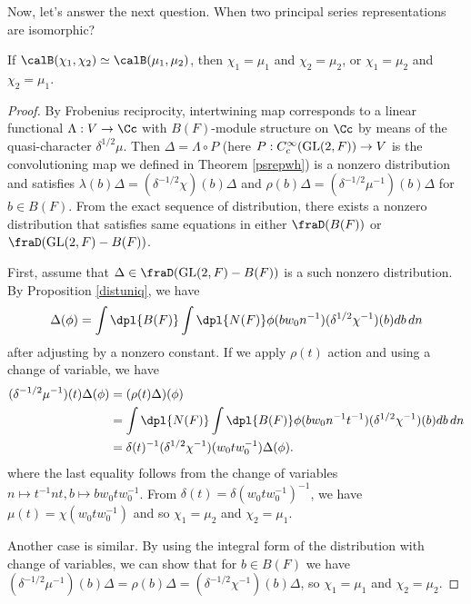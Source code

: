 Now, let's answer the next question. When two principal series representations  are isomorphic?
\begin{theorem}
If $\calB(\chi_1, \chi_2)\simeq \calB(\mu_1, \mu_2)$, then $\chi_1 = \mu_1$ and $\chi_2 = \mu_2$, or $\chi_1 = \mu_2$ and $\chi_2 = \mu_1$. 
\end{theorem}
\begin{proof}
By Frobenius reciprocity, intertwining map corresponds to a linear functional $\Lambda:V\to \Cc$ with $B(F)$-module structure on $\Cc$ by means of the quasi-character $\delta^{1/2}\mu$. 
Then $\Delta = \Lambda \circ P$ (here $P:C_{c}^{\infty}(\mathrm{GL}(2, F))\to V$ is the convolutioning map we defined in Theorem \ref{psrepwh})  is a nonzero distribution and satisfies $\lambda(b)\Delta = (\delta^{-1/2}\chi)(b)\Delta$ and $\rho(b)\Delta = (\delta^{-1/2}\mu^{-1})(b)\Delta$ for $b\in B(F)$. 
From the exact sequence of distribution, there exists a nonzero distribution that satisfies same equations in either $\fraD(B(F))$ or $\fraD(\GL(2, F) - B(F))$. 

First, assume that  $\Delta\in \fraD(\GL(2, F) - B(F))$ is a such nonzero distribution. By Proposition \ref{distuniq}, we have
$$
\Delta(\phi) = \int\dpl{B(F)}\int\dpl{N(F)} \phi(bw_{0}n^{-1}) (\delta^{1/2}\chi^{-1})(b) db\,dn
$$
after adjusting by a nonzero constant. If we apply $\rho(t)$ action and using a change of variable, we have
\begin{align*}
(\delta^{-1/2}\mu^{-1})(t)\Delta(\phi) &= (\rho(t)\Delta)(\phi) \\
&=\int\dpl{N(F)}\int\dpl{B(F)} \phi(bw_{0}n^{-1}t^{-1})(\delta^{1/2}\chi^{-1})(b)db\,dn \\
&=\delta(t)^{-1}(\delta^{1/2}\chi^{-1})(w_{0}tw_{0}^{-1})\Delta(\phi).
\end{align*}
where the last equality follows from the change of variables $n\mapsto t^{-1}nt, b\mapsto bw_{0}tw_{0}^{-1}$. From $\delta(t) = \delta(w_{0}tw_{0}^{-1})^{-1}$, we have $\mu(t) = \chi(w_{0}tw_{0}^{-1})$ and so $\chi_1 = \mu_2$ and $\chi_2 = \mu_1$. 

Another case is similar. By using the integral form of the distribution with change of variables, we can show that for $b\in B(F)$ we have $(\delta^{-1/2}\mu^{-1})(b)\Delta = \rho(b)\Delta = (\delta^{-1/2}\chi^{-1})(b)\Delta$, so $\chi_1 = \mu_1$ and $\chi_2 = \mu_2$. 
\end{proof}

